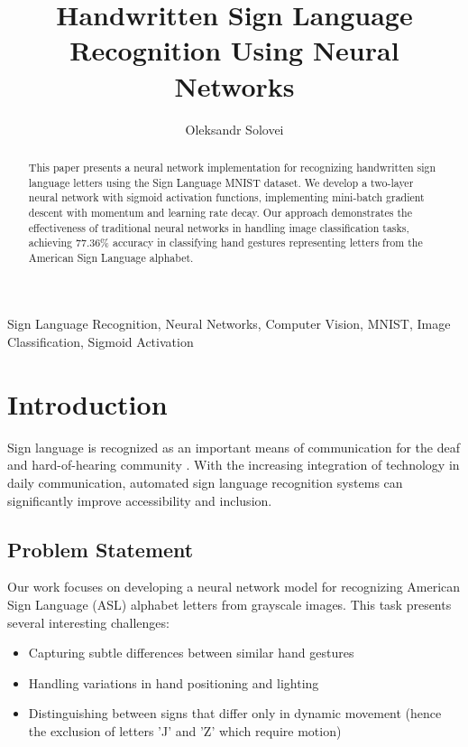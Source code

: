 \documentclass[times,final,english]{revdetua}
\begin{document}
\title{Handwritten Sign Language Recognition Using Neural Networks}

\author{Oleksandr Solovei}

\maketitle

\begin{abstract}
This paper presents a neural network implementation for recognizing handwritten sign language letters using the Sign Language MNIST dataset. We develop a two-layer neural network with sigmoid activation functions, implementing mini-batch gradient descent with momentum and learning rate decay. Our approach demonstrates the effectiveness of traditional neural networks in handling image classification tasks, achieving 77.36\% accuracy in classifying hand gestures representing letters from the American Sign Language alphabet.
\end{abstract}

\begin{keywords}
Sign Language Recognition, Neural Networks, Computer Vision, MNIST, Image Classification, Sigmoid Activation
\end{keywords}

\section{Introduction}

Sign language is recognized as an important means of communication for the deaf and hard-of-hearing community \cite{cooper}. With the increasing integration of technology in daily communication, automated sign language recognition systems can significantly improve accessibility and inclusion.



\subsection{Problem Statement}
Our work focuses on developing a neural network model for recognizing American Sign Language (ASL) alphabet letters from grayscale images. This task presents several interesting challenges:
\begin{itemize}
    \item Capturing subtle differences between similar hand gestures
    \item Handling variations in hand positioning and lighting
    \item Distinguishing between signs that differ only in dynamic movement (hence the exclusion of letters 'J' and 'Z' which require motion)
\end{itemize}
\end{document}
